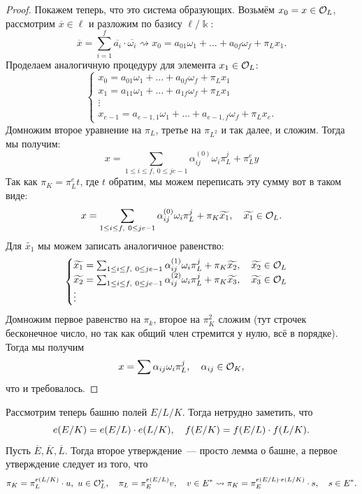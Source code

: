 \begin{proof}
	 Покажем теперь, что это система образующих. Возьмём $x_0 = x \in \cO_{L}$, рассмотрим $\overline{x} \in \ell$ и разложим по базису $\ell/\Bbbk$:
	 \[
	 	\overline{x} = \sum_{i = 1}^{f} \overline{a_{i}} \cdot \overline{\omega_i} \rightsquigarrow x_0 = a_{0 1} \omega_1 + \ldots + a_{0 f} \omega_f + \pi_L x_1.
	 \]
	 Проделаем аналогичную процедуру для элемента $x_1 \in \cO_{L}$: 
	 \[
	 	\begin{cases} 
	 	x_0 = a_{0 1} \omega_1 + \ldots + a_{0 f} \omega_f + \pi_L x_1 \\
	 	x_1 = a_{1 1} \omega_1 + \ldots + a_{1 f} \omega_f + \pi_L x_1 \\ 
	 	\vdots \\ 
	 	x_{e - 1} = a_{e - 1, 1} \omega_{1} + \ldots + a_{e - 1, f} \omega_{f} + \pi_{L} x_{e}.
	 	 \end{cases}
	 \]
	 Домножим второе уравнение на $\pi_{L}$, третье на $\pi_{L^2}$ и так далее, и сложим. Тогда мы получим: 
	 \[
	 	x = \sum_{1 \le i \le f, \ 0 \le j e - 1 } \alpha_{i j}^{(0)} \omega_i \pi_{L}^{j} + \pi_{L}^{e} y 
	 \]
	 Так как $\pi_K = \pi_L^{e} t$, где $t$ обратим, мы можем переписать эту сумму вот в таком виде: 
	 \[
	 	x = \sum_{1 \le i \le f, \ 0 \le j e - 1 } \alpha_{i j}^{(0)} \omega_i \pi_{L}^{j} + \pi_{K} \widetilde{x_1}, \quad \widetilde{x_1} \in \cO_{L}.
	 \]
	 Для $\widetilde{x_1}$ мы можем записать аналогичное равенство: 
	 \[
	 	\begin{cases} \widetilde{x_1} = \sum_{1 \le i \le f, \ 0 \le j e - 1 } \alpha_{i j}^{(1)} \omega_i \pi_{L}^{j} + \pi_{K} \widetilde{x_2}, \quad \widetilde{x_2} \in \cO_{L} \\
		\widetilde{x_2} = \sum_{1 \le i \le f, \ 0 \le j e - 1 } \alpha_{i j}^{(2)} \omega_i \pi_{L}^{j} + \pi_{K} \widetilde{x_3}, \quad \widetilde{x_3} \in \cO_{L} \\ 
		\vdots
	 	\end{cases}
	 \]
	 Домножим первое равенство на $\pi_k$, второе на $\pi_K^2$  сложим (тут строчек бесконечное число, но так как общий член стремится у нулю, всё в порядке). Тогда мы получим 
	 \[
	 	x = \sum \alpha_{i j} \omega_i \pi_{L}^j, \quad \alpha_{i j} \in \cO_{K},
	 \]
	 что и требовалось. 
	 \end{proof}

	 Рассмотрим теперь башню полей $E/L/K$. Тогда нетрудно заметить, что 
	 \[
	 	e\lr*{E/K} = e\lr*{E/L} \cdot e\lr*{L/K}, \quad f\lr*{E/K} = f\lr*{E/L} \cdot f\lr*{L/K}.
	 \]
	 Пусть $\overline{E},\overline{K}, \overline{L}$. Тогда второе утверждение~--- просто лемма о башне, а первое утверждение следует из того, что 
	 \[
	 	\pi_{K} = \pi_{L}^{e\lr*{L/K}} \cdot u, \ u \in \cO_{L}^{*}, \quad \pi_{L} = \pi_{E}^{e\lr*{E/L}} v, \quad v \in E^{*} \rightsquigarrow \pi_{K} = \pi_{E}^{e\lr*{E/L} \cdot e\lr*{L/K}} \cdot s, \quad s \in E^{*}.
	 \]


